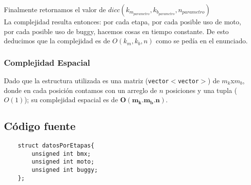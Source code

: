 Finalmente retornamos el valor de $dicc(k_{m_{parametro}},k_{b_{parametro}},n_{parametro})$\\

La complejidad resulta entonces: por cada etapa, por cada posible uso de moto, por cada posible uso de buggy, hacemos cosas en tiempo constante. De esto deducimos que la complejidad es de $O(k_{m},k_{b},n)$ como se ped\'ia en el enunciado.

\subsubsection{Complejidad Espacial}
Dado que la estructura utilizada es una matriz (\texttt{vector$<$vector$>$}) de $m_k$x$m_b$, donde en cada posici\'on contamos con un arreglo de $n$ posiciones y una tupla ($O(1)$); su complejidad espacial es de $\mathbf{O(m_k.m_b.n)}$.

\newpage
\subsection{C\'odigo fuente}
	\begin{codesnippet}
	\begin{verbatim}
    struct datosPorEtapas{
        unsigned int bmx;
        unsigned int moto;
        unsigned int buggy;
    };
	\end{verbatim}
	\end{codesnippet}

